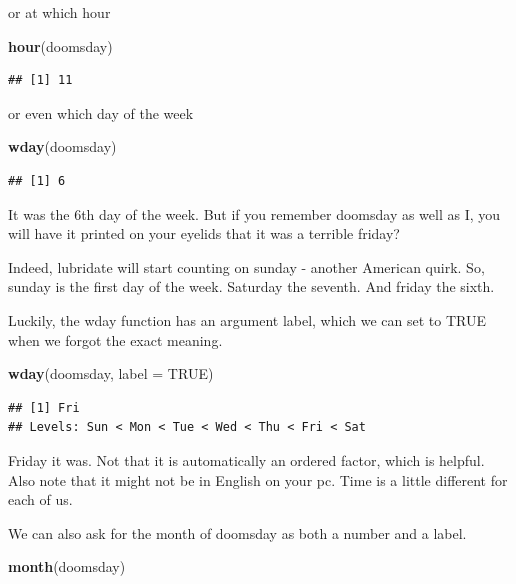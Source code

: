 \documentclass[]{tufte-book}
\newenvironment{Shaded}{}{}
\newcommand{\DataTypeTok}[1]{\textcolor[rgb]{0.56,0.13,0.00}{#1}}
\newcommand{\KeywordTok}[1]{\textcolor[rgb]{0.00,0.44,0.13}{\textbf{#1}}}
\newcommand{\NormalTok}[1]{#1}
\newcommand{\OtherTok}[1]{\textcolor[rgb]{0.00,0.44,0.13}{#1}}
\begin{document}
or at which hour

\begin{Shaded}
\begin{Highlighting}[]
\KeywordTok{hour}\NormalTok{(doomsday)}
\end{Highlighting}
\end{Shaded}

\begin{verbatim}
## [1] 11
\end{verbatim}

or even which day of the week

\begin{Shaded}
\begin{Highlighting}[]
\KeywordTok{wday}\NormalTok{(doomsday)}
\end{Highlighting}
\end{Shaded}

\begin{verbatim}
## [1] 6
\end{verbatim}

It was the 6th day of the week. But if you remember doomsday as well as I, you will have it printed on your eyelids that it was a terrible friday?

Indeed, lubridate will start counting on sunday - another American quirk. So, sunday is the first day of the week. Saturday the seventh. And friday the sixth.

Luckily, the wday function has an argument label, which we can set to TRUE when we forgot the exact meaning.

\begin{Shaded}
\begin{Highlighting}[]
\KeywordTok{wday}\NormalTok{(doomsday, }\DataTypeTok{label =} \OtherTok{TRUE}\NormalTok{)}
\end{Highlighting}
\end{Shaded}

\begin{verbatim}
## [1] Fri
## Levels: Sun < Mon < Tue < Wed < Thu < Fri < Sat
\end{verbatim}

Friday it was. Not that it is automatically an ordered factor, which is helpful. Also note that it might not be in English on your pc. Time is a little different for each of us.

We can also ask for the month of doomsday as both a number and a label.

\begin{Shaded}
\begin{Highlighting}[]
\KeywordTok{month}\NormalTok{(doomsday)}
\end{Highlighting}
\end{Shaded}
\end{document}
